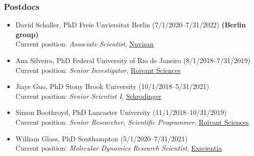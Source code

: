 \documentclass[10pt]{article}
\begin{document}
\subsubsection*{Postdocs}

\begin{itemize}

  \item David Schaller, PhD Freie Unviersitat Berlin (7/1/2020--7/31/2022) {\bf (Berlin group)}\\
  Current position: \emph{Associate Scientist}, \href{https://www.nuvisan.com/}{Nuvisan}

  \item Ana Silveira, PhD Federal University of Rio de Janeiro (8/1/2018--7/31/2019)\\
  Current position: \emph{Senior Investigator}, \href{https://www.roivant.com/}{Roivant Sciences}  

  \item Jiaye Guo, PhD Stony Brook University (10/1/2018--5/31/2021)\\
  Current position: \emph{Senior Scientist I}, \href{http://schrodinger.com}{Schrodinger}
  
  \item Simon Boothroyd, PhD Lancaster University (11/1/2018--10/31/2019)\\
  Current position: \emph{Senior Researcher, Scientific Programmer}, \href{https://www.roivant.com/}{Roivant Sciences}
  
  \item William Glass, PhD Southampton (5/1/2020--7/31/2021) \\
  Current position: \emph{Molecular Dynamics Research Scientist}, \href{https://www.exscientia.ai/}{Exscientia}


\end{itemize}
\end{document}
